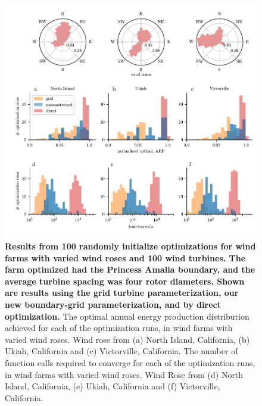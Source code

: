 \documentclass[wes, manuscript]{copernicus}
\begin{document}
\begin{figure}
\centering
\includegraphics{paper-figures/results_roses.pdf}
\caption{\textbf{Results from 100 randomly initialize optimizations for wind farms with varied wind roses and 100 wind turbines. The farm optimized had the Princess Amalia boundary, and the average turbine spacing was four rotor diameters. Shown are results using the grid turbine parameterization, our new boundary-grid parameterization, and by direct optimization.} The optimal annual energy production distribution achieved for each of the optimization runs, in wind farms with varied wind roses.  Wind rose from (a) North Island, California, (b) Ukiah, California and (c) Victorville, California. The number of function calls required to converge for each of the optimization runs, in wind farms with varied wind roses. Wind Rose from (d) North Island, California, (e) Ukiah, California and (f) Victorville, California. }
\label{results-roses}
\end{figure}
\end{document}
